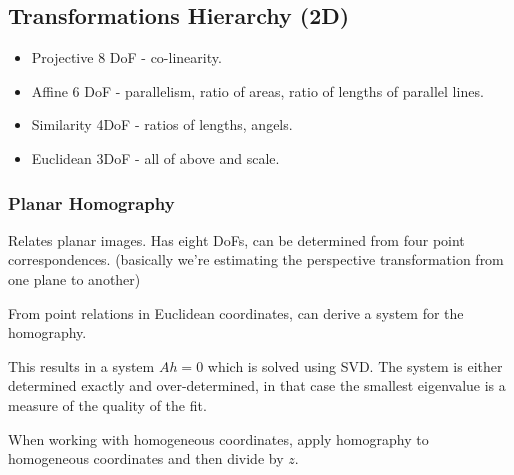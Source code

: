 \subsection{Transformations Hierarchy (2D)}

\begin{itemize}
\item Projective 8 DoF - co-linearity.
\item Affine 6 DoF - parallelism, ratio of areas, ratio of lengths of parallel lines.
\item Similarity 4DoF - ratios of lengths, angels.
\item Euclidean 3DoF - all of above and scale.
\end{itemize}



\subsubsection{Planar Homography}

Relates planar images. Has eight DoFs, can be determined from four point correspondences.
(basically we're estimating the perspective transformation from one plane to another)

From point relations in Euclidean coordinates, can derive a system for the homography. 

This results in a system $Ah = 0$ which is solved using SVD. 
The system is either determined exactly and over-determined, in that case the smallest eigenvalue is a measure of the quality of the fit.

When working with homogeneous coordinates, apply homography to homogeneous coordinates and then divide by $z$.



